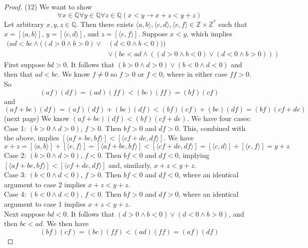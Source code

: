 \documentclass{report}
\begin{document}
\begin{proof}(12)
We want to show
\begin{equation*}
\forall x\in\mathbb Q\forall y\in\mathbb Q\forall z\in\mathbb Q(x<y\to x+z<y+z)
\end{equation*}
Let arbitrary $x,y,z\in\mathbb Q$. Then there exists $\langle a,b\rangle,\langle c,d\rangle,\langle e,f\rangle\in\mathbb Z\times\mathbb Z^*$ such that 
$x=[\langle a,b\rangle]$, $y=[\langle c,d\rangle]$, and $z=[\langle e,f\rangle]$. Suppose $x<y$, which implies
\begin{align*}
(ad<bc\land((d>0\land b>0)\lor&(d<0\land b<0)))\\
&\lor(bc<ad\land((d>0\land b<0)\lor(d<0\land b>0)))
\end{align*}
First suppose $bd>0$. It follows that $(b>0\land d>0)\lor(b<0\land d<0)$ and then that $ad<bc$.
We know $f\neq0$ so $f>0$ or $f<0$, where in either case $ff>0$. So
\begin{equation*}
(af)(df)=(ad)(ff)<(bc)(ff)=(bf)(cf)
\end{equation*}
and
\begin{equation*}
(af+be)(df)=(af)(df)+(be)(df)<(bf)(cf)+(be)(df)=(bf)(cf+de)
\end{equation*}
(next page)\newpage
\indent We know $(af+be)(df)<(bf)(cf+de)$. 
We have four cases:\\
\indent Case 1: $(b>0\land d>0)$, $f>0$. Then $bf>0$ and $df>0$. This, combined with the above, implies $[\langle af+be,bf\rangle]<[\langle cf+de,df\rangle]$. We have
\begin{equation*}
x+z=[\langle a,b\rangle]+[\langle e,f\rangle]=[\langle af+be,bf\rangle]
<[\langle cf+de,df\rangle]=[\langle c,d\rangle]+[\langle e,f\rangle]=y+z
\end{equation*}
\indent Case 2: $(b>0\land d>0)$, $f<0$. Then $bf<0$ and $df<0$, implying $[\langle af+be,bf\rangle]<[\langle cf+de,df\rangle]$ and, similarly, $x+z<y+z$.\\
\indent Case 3: $(b<0\land d<0)$, $f>0$. Then $bf<0$ and $df<0$, where an identical argument to case 2 implies $x+z<y+z$.\\
\indent Case 4: $(b<0\land d<0)$, $f<0$. Then $bf>0$ and $df>0$, where an identical argument to case 1 implies $x+z<y+z$.\\
\indent Next suppose $bd<0$. It follows that $(d>0\land b<0)\lor(d<0\land b>0)$, and then $bc<ad$. We then have
\begin{equation*}
(bf)(cf)=(bc)(ff)<(ad)(ff)=(af)(df)
\end{equation*}

\end{proof}
\end{document}
